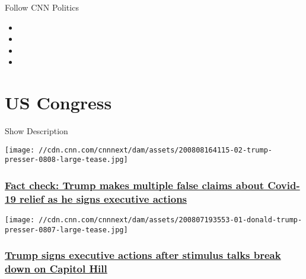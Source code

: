 Follow CNN Politics

\begin{itemize}
\item
\item
\item
\item
\end{itemize}

\hypertarget{us-congress}{%
\section{US Congress}\label{us-congress}}

Show Description

\href{/2020/08/08/politics/fact-check-trump-covid-executive-actions-bedminster/index.html}{}

\texttt{[image: //cdn.cnn.com/cnnnext/dam/assets/200808164115-02-trump-presser-0808-large-tease.jpg]}

\hypertarget{fact-check-trump-makes-multiple-false-claims-about-covid-19-relief-as-he-signs-executive-actions}{%
\subsubsection{\texorpdfstring{\href{/2020/08/08/politics/fact-check-trump-covid-executive-actions-bedminster/index.html}{Fact
check: Trump makes multiple false claims about Covid-19 relief as he
signs executive
actions}}{Fact check: Trump makes multiple false claims about Covid-19 relief as he signs executive actions}}\label{fact-check-trump-makes-multiple-false-claims-about-covid-19-relief-as-he-signs-executive-actions}}

\href{/2020/08/08/politics/trump-executive-order-stimulus/index.html}{}

\texttt{[image: //cdn.cnn.com/cnnnext/dam/assets/200807193553-01-donald-trump-presser-0807-large-tease.jpg]}

\hypertarget{trump-signs-executive-actions-after-stimulus-talks-break-down-on-capitol-hill-}{%
\subsubsection{\texorpdfstring{\href{/2020/08/08/politics/trump-executive-order-stimulus/index.html}{Trump
signs executive actions after stimulus talks break down on Capitol Hill
}}{Trump signs executive actions after stimulus talks break down on Capitol Hill }}\label{trump-signs-executive-actions-after-stimulus-talks-break-down-on-capitol-hill-}}

